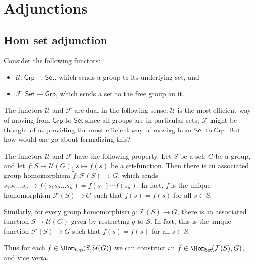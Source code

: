 \documentclass[notes.tex]{subfiles}
\begin{document}
\chapter{Adjunctions}\label{sec:adjunctions}

\section{Hom set adjunction}
\label{sec:hom_set_adjunction}

Consider the following functors:
\begin{itemize}
  \item $\mathcal{U}\colon \mathsf{Grp} \rightarrow \mathsf{Set}$, which sends a group to its underlying set, and

  \item $\mathcal{F}\colon \mathsf{Set} \rightarrow \mathsf{Grp}$, which sends a set to the free group on it.
\end{itemize}

The functors $\mathcal{U}$ and $\mathcal{F}$ are dual in the following sense: $\mathcal{U}$ is the most efficient way of moving from $\mathsf{Grp}$ to $\mathsf{Set}$ since all groups are in particular sets; $\mathcal{F}$ might be thought of as providing the most efficient way of moving from $\mathsf{Set}$ to $\mathsf{Grp}$. But how would one go about formalizing this?

The functors $\mathcal{U}$ and $\mathcal{F}$ have the following property. Let $S$ be a set, $G$ be a group, and let $f\colon S \to \mathcal{U}(G)$, $s \mapsto f(s)$ be a set-function. Then there is an associated group homomorphism $\tilde{f}\colon \mathcal{F}(S) \to G$, which sends $s_{1}s_{2}\dots s_{n} \mapsto f(s_{1}s_{2}\dots s_{n}) = f(s_{1})\cdots f(s_{n})$. In fact, $\tilde{f}$ is the unique homomorphism $\mathcal{F}(S) \to G$ such that $f(s) = \tilde{f}(s)$ for all $s \in S$.

Similarly, for every group homomorphism $g\colon \mathcal{F}(S) \to G$, there is an associated function $S \to \mathcal{U}(G)$ given by restricting $g$ to $S$. In fact, this is the unique function $\mathcal{F}(S) \to G$ such that $f(s) = \tilde{f}(s)$ for all $s \in S$.

Thus for each $f \in \Hom_{\mathsf{Grp}}(S, \mathcal{U}(G))$ we can construct an $\tilde{f} \in \Hom_{\mathsf{Set}}(\mathcal{F}(S), G)$, and vice versa.
\end{document}
